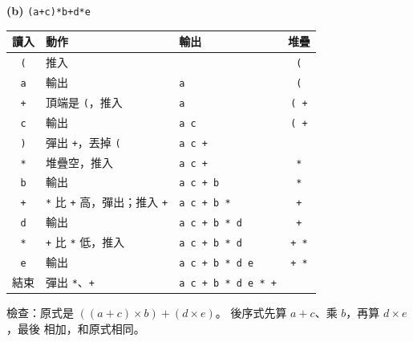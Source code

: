 \begin{pastsoln}
\textbf{(b)} \texttt{(a+c)*b+d*e}
\begin{center}
\small
\begin{tabular}{cllc}
\toprule
讀入 & 動作 & 輸出 & 堆疊 \\
\midrule
\texttt{(} & 推入 & & \texttt{(} \\
\texttt{a} & 輸出 & \texttt{a} & \texttt{(} \\
\texttt{+} & 頂端是 \texttt{(}，推入 & \texttt{a} & \texttt{( +} \\
\texttt{c} & 輸出 & \texttt{a c} & \texttt{( +} \\
\texttt{)} & 彈出 \texttt{+}，丟掉 \texttt{(} & \texttt{a c +} & \\
\texttt{*} & 堆疊空，推入 & \texttt{a c +} & \texttt{*} \\
\texttt{b} & 輸出 & \texttt{a c + b} & \texttt{*} \\
\texttt{+} & \texttt{*} 比 \texttt{+} 高，彈出；推入 \texttt{+} & \texttt{a c + b *} & \texttt{+} \\
\texttt{d} & 輸出 & \texttt{a c + b * d} & \texttt{+} \\
\texttt{*} & \texttt{+} 比 \texttt{*} 低，推入 & \texttt{a c + b * d} & \texttt{+ *} \\
\texttt{e} & 輸出 & \texttt{a c + b * d e} & \texttt{+ *} \\
結束 & 彈出 \texttt{*}、\texttt{+} & \texttt{a c + b * d e * +} & \\
\bottomrule
\end{tabular}
\end{center}
檢查：原式是 $((a + c) \times b) + (d \times e)$。 後序式先算 $a + c$、乘 $b$，再算 $d \times e$，最後
相加，和原式相同。
\end{pastsoln}
